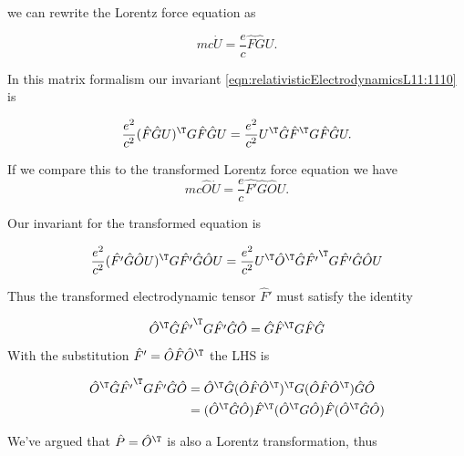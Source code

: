 we can rewrite the Lorentz force equation as

\begin{equation}\label{eqn:relativisticElectrodynamicsL11:1150}
m c \dot{U} = \frac{e}{c} \hat{F} \hat{G} U.
\end{equation}

In this matrix formalism our invariant \ref{eqn:relativisticElectrodynamicsL11:1110} is

\begin{equation}\label{eqn:relativisticElectrodynamicsL11:1200}
\frac{e^2}{c^2} (\hat{F} \hat{G} U)^\T G \hat{F} \hat{G} U
=
\frac{e^2}{c^2} U^\T \hat{G} \hat{F}^\T G \hat{F} \hat{G} U.
\end{equation}

If we compare this to the transformed Lorentz force equation we have
\begin{equation}\label{eqn:relativisticElectrodynamicsL11:1220}
m c \hat{O} \dot{U} = \frac{e}{c} \hat{F'} \hat{G} \hat{O} U.
\end{equation}

Our invariant for the transformed equation is

\begin{align*}
\frac{e^2}{c^2} (\hat{F'} \hat{G} \hat{O} U)^\T G \hat{F'} \hat{G} \hat{O} U
&=
\frac{e^2}{c^2} U^\T \hat{O}^\T \hat{G} \hat{F'}^\T G \hat{F'} \hat{G} \hat{O} U \\
\end{align*}

Thus the transformed electrodynamic tensor $\hat{F}'$ must satisfy the identity

\begin{equation}\label{eqn:relativisticElectrodynamicsL11:1240}
\hat{O}^\T \hat{G} \hat{F'}^\T G \hat{F'} \hat{G} \hat{O} = \hat{G} \hat{F}^\T G \hat{F} \hat{G} 
\end{equation}

With the substitution $\hat{F}' = \hat{O} \hat{F} \hat{O}^\T$ the LHS is

\begin{align*}
\hat{O}^\T \hat{G} \hat{F'}^\T G \hat{F'} \hat{G} \hat{O} 
&=
\hat{O}^\T \hat{G} ( \hat{O} \hat{F} \hat{O}^\T)^\T
G 
(\hat{O} \hat{F} \hat{O}^\T)
\hat{G} \hat{O}  \\
&=
(\hat{O}^\T \hat{G} \hat{O}) \hat{F}^\T (\hat{O}^\T G \hat{O}) \hat{F} (\hat{O}^\T \hat{G} \hat{O}) \\
\end{align*}

We've argued that $\hat{P} = \hat{O}^\T$ is also a Lorentz transformation, thus 

